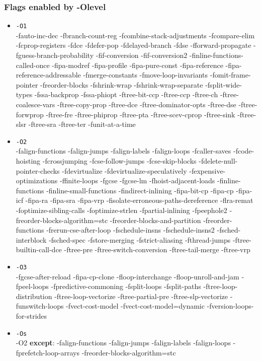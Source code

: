 \documentclass[aspectratio=169]{beamer}
\begin{document}
\begin{frame}
\frametitle{Flags enabled by -Olevel}

\begin{itemize}
  \item{\texttt{-O1}} \\
  {\tiny\setstretch{0.4ex} -fauto-inc-dec -fbranch-count-reg -fcombine-stack-adjustments -fcompare-elim -fcprop-registers -fdce -fdefer-pop -fdelayed-branch -fdse -fforward-propagate -fguess-branch-probability -fif-conversion -fif-conversion2 -finline-functions-called-once -fipa-modref -fipa-profile -fipa-pure-const -fipa-reference -fipa-reference-addressable -fmerge-constants -fmove-loop-invariants -fomit-frame-pointer -freorder-blocks -fshrink-wrap -fshrink-wrap-separate -fsplit-wide-types -fssa-backprop -fssa-phiopt -ftree-bit-ccp -ftree-ccp -ftree-ch -ftree-coalesce-vars -ftree-copy-prop -ftree-dce -ftree-dominator-opts -ftree-dse -ftree-forwprop -ftree-fre -ftree-phiprop -ftree-pta -ftree-scev-cprop -ftree-sink -ftree-slsr -ftree-sra -ftree-ter -funit-at-a-time \\
    }

  \item{\texttt{-O2}} \\
  {\tiny\setstretch{0.4ex} -falign-functions  -falign-jumps -falign-labels  -falign-loops -fcaller-saves -fcode-hoisting -fcrossjumping -fcse-follow-jumps  -fcse-skip-blocks -fdelete-null-pointer-checks -fdevirtualize  -fdevirtualize-speculatively -fexpensive-optimizations -ffinite-loops -fgcse  -fgcse-lm -fhoist-adjacent-loads -finline-functions -finline-small-functions -findirect-inlining -fipa-bit-cp  -fipa-cp  -fipa-icf -fipa-ra  -fipa-sra  -fipa-vrp -fisolate-erroneous-paths-dereference -flra-remat -foptimize-sibling-calls -foptimize-strlen -fpartial-inlining -fpeephole2 -freorder-blocks-algorithm=stc -freorder-blocks-and-partition  -freorder-functions -frerun-cse-after-loop -fschedule-insns  -fschedule-insns2 -fsched-interblock  -fsched-spec -fstore-merging -fstrict-aliasing -fthread-jumps -ftree-builtin-call-dce -ftree-pre -ftree-switch-conversion  -ftree-tail-merge -ftree-vrp \\
    }

  \item{\texttt{-O3}}\\
  {\tiny\setstretch{0.4ex} -fgcse-after-reload -fipa-cp-clone -floop-interchange -floop-unroll-and-jam -fpeel-loops -fpredictive-commoning -fsplit-loops -fsplit-paths -ftree-loop-distribution -ftree-loop-vectorize -ftree-partial-pre -ftree-slp-vectorize -funswitch-loops -fvect-cost-model -fvect-cost-model=dynamic -fversion-loops-for-strides \\
    }

  \item{\texttt{-Os}}\\
  {\tiny\setstretch{0.4ex} -O2 \textbf{except}:
-falign-functions -falign-jumps -falign-labels -falign-loops -fprefetch-loop-arrays -freorder-blocks-algorithm=stc \\
    }
\end{itemize}

\end{frame}
\end{document}
